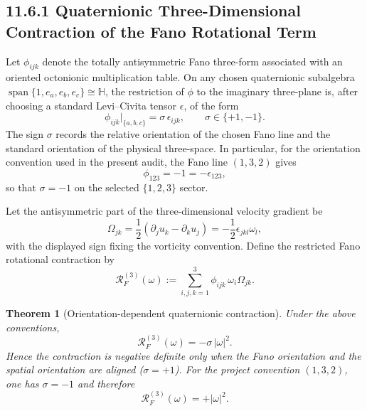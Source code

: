 \documentclass{article}
\newtheorem{theorem}{Theorem}[section]
\begin{document}
\subsection*{11.6.1 Quaternionic Three-Dimensional Contraction of the Fano Rotational Term}
\label{sec:fano-3d-contraction}

Let $\phi_{ijk}$ denote the totally antisymmetric Fano three-form associated with
an oriented octonionic multiplication table.  On any chosen quaternionic
subalgebra $\operatorname{span}\{1,e_a,e_b,e_c\}\cong\mathbb H$, the restriction
of $\phi$ to the imaginary three-plane is, after choosing a standard
Levi--Civita tensor $\epsilon$, of the form
\begin{equation}
\phi_{ijk}\big|_{\{a,b,c\}}=\sigma\,\epsilon_{ijk},\qquad \sigma\in\{+1,-1\}.
\end{equation}
The sign $\sigma$ records the relative orientation of the chosen Fano line and
the standard orientation of the physical three-space.  In particular, for the
orientation convention used in the present audit, the Fano line
$(1,3,2)$ gives
\begin{equation}
\phi_{123}=-1=-\epsilon_{123},
\end{equation}
so that $\sigma=-1$ on the selected $\{1,2,3\}$ sector.

Let the antisymmetric part of the three-dimensional velocity gradient be
\begin{equation}
\Omega_{jk}=\frac12(\partial_j u_k-\partial_k u_j)
          =-\frac12\epsilon_{jkl}\omega_l,
\end{equation}
with the displayed sign fixing the vorticity convention.  Define the restricted
Fano rotational contraction by
\begin{equation}
\mathcal R_F^{(3)}(\omega)
:=\sum_{i,j,k=1}^{3}\phi_{ijk}\,\omega_i\Omega_{jk}.
\end{equation}

\begin{theorem}[Orientation-dependent quaternionic contraction]
Under the above conventions,
\begin{equation}
\boxed{
\mathcal R_F^{(3)}(\omega)=-\sigma\,|\omega|^2.
}
\end{equation}
Hence the contraction is negative definite only when the Fano orientation and
the spatial orientation are aligned ($\sigma=+1$).  For the project convention
$(1,3,2)$, one has $\sigma=-1$ and therefore
\begin{equation}
\mathcal R_F^{(3)}(\omega)=+|\omega|^2.
\end{equation}
\end{theorem}
\end{document}
